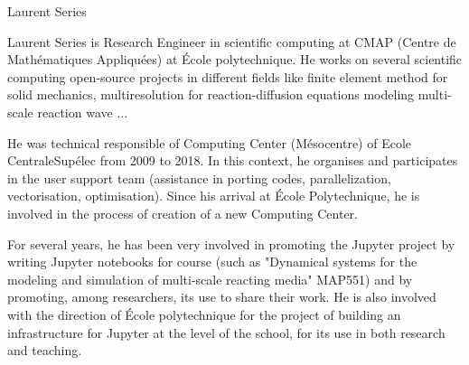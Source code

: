 \begin{participant}[type=R,PM=2,gender=male]{Laurent Series}

    Laurent Series is Research Engineer in scientific computing at CMAP (Centre 
    de Mathématiques Appliquées) at \'Ecole polytechnique. He works on several
    scientific computing open-source projects in different fields like
    finite element method for solid mechanics, multiresolution for 
    reaction-diffusion equations modeling multi-scale reaction wave ...
  
    He was technical responsible of Computing Center (M\'esocentre) of Ecole
    CentraleSup\'elec from 2009 to 2018. In this context, he organises and 
    participates in the user support team (assistance in porting codes, 
    parallelization, vectorisation, optimisation). Since his arrival at \'Ecole 
    Polytechnique, he is involved in the process of creation of a new Computing 
    Center.
    
    For several years, he has been very involved in promoting the Jupyter project
    by writing Jupyter notebooks for course (such as "Dynamical systems for the 
    modeling and simulation of multi-scale reacting media" MAP551) and by promoting, 
    among researchers, its use to share their work. He is also involved with the 
    direction of \'Ecole polytechnique for the project of building an infrastructure 
    for Jupyter at the level of the school, for its use in both research and teaching.
  
\end{participant}